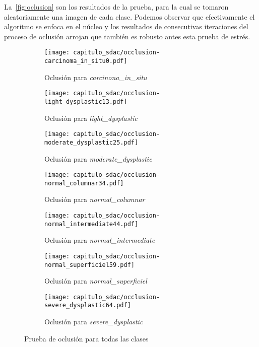 La~\autoref{fig:oclusion} son los resultados de la prueba, para la cual se tomaron
aleatoriamente una imagen de cada clase. Podemos observar que efectivamente el 
algoritmo se enfoca en el núcleo y los resultados de consecutivas iteraciones del proceso
de oclusión arrojan que también es robusto antes esta prueba de estrés.
  \begin{figure}[H] %
    \begin{subfigure}{0.40\textwidth}
    \texttt{[image: capitulo\_sdac/occlusion-carcinoma\_in\_situ0.pdf]}
    \caption{Oclusión para \emph{carcinona\_in\_situ}}\label{fig:a}
    \end{subfigure}\hspace*{\fill}
    \begin{subfigure}{0.40\textwidth}
    \texttt{[image: capitulo\_sdac/occlusion-light\_dysplastic13.pdf]}
    \caption{Oclusión para \emph{light\_dysplastic}}\label{fig:b}
    \end{subfigure}
    
    \medskip
    \begin{subfigure}{0.40\textwidth}
    \texttt{[image: capitulo\_sdac/occlusion-moderate\_dysplastic25.pdf]}
    \caption{Oclusión para \emph{moderate\_dysplastic}}\label{fig:c}
    \end{subfigure}\hspace*{\fill}
    \begin{subfigure}{0.40\textwidth}
    \texttt{[image: capitulo\_sdac/occlusion-normal\_columnar34.pdf]}
    \caption{Oclusión para \emph{normal\_columnar}}\label{fig:d}
    \end{subfigure}
    
    \medskip
    \begin{subfigure}{0.40\textwidth}
    \texttt{[image: capitulo\_sdac/occlusion-normal\_intermediate44.pdf]}
    \caption{Oclusión para \emph{normal\_intermediate}}\label{fig:c}
    \end{subfigure}\hspace*{\fill}
    \begin{subfigure}{0.40\textwidth}
    \texttt{[image: capitulo\_sdac/occlusion-normal\_superficiel59.pdf]}
    \caption{Oclusión para \emph{normal\_superficiel}}\label{fig:d}
    \end{subfigure}

    \centering
    \begin{subfigure}{0.40\textwidth}
      
    \texttt{[image: capitulo\_sdac/occlusion-severe\_dysplastic64.pdf]}
    \caption{Oclusión para \emph{severe\_dysplastic}}\label{fig:e}
    \end{subfigure}
    
    \caption{Prueba de oclusión para todas las clases}\label{fig:oclusion}
    \end{figure}
    

